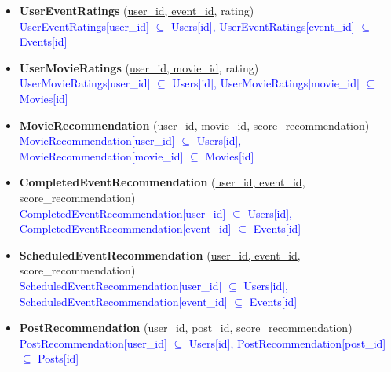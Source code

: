 \begin{itemize}[label={},left=0pt]
    \item \textbf{UserEventRatings} (\underline{user\_id, event\_id}, rating) \\
    \textcolor{blue}{UserEventRatings[user\_id] $\subseteq$ Users[id], UserEventRatings[event\_id] $\subseteq$ Events[id]}
    \item \textbf{UserMovieRatings} (\underline{user\_id, movie\_id}, rating) \\
    \textcolor{blue}{UserMovieRatings[user\_id] $\subseteq$ Users[id], UserMovieRatings[movie\_id] $\subseteq$ Movies[id]}

    \item \textbf{MovieRecommendation} (\underline{user\_id, movie\_id}, score\_recommendation) \\
    \textcolor{blue}{MovieRecommendation[user\_id] $\subseteq$ Users[id], MovieRecommendation[movie\_id] $\subseteq$ Movies[id]}
    \item \textbf{CompletedEventRecommendation} (\underline{user\_id, event\_id}, score\_recommendation) \\
    \textcolor{blue}{CompletedEventRecommendation[user\_id] $\subseteq$ Users[id], CompletedEventRecommendation[event\_id] $\subseteq$ Events[id]}
    \item \textbf{ScheduledEventRecommendation} (\underline{user\_id, event\_id}, score\_recommendation) \\
    \textcolor{blue}{ScheduledEventRecommendation[user\_id] $\subseteq$ Users[id], ScheduledEventRecommendation[event\_id] $\subseteq$ Events[id]}
    \item \textbf{PostRecommendation} (\underline{user\_id, post\_id}, score\_recommendation) \\
    \textcolor{blue}{PostRecommendation[user\_id] $\subseteq$ Users[id], PostRecommendation[post\_id] $\subseteq$ Posts[id]}
\end{itemize}